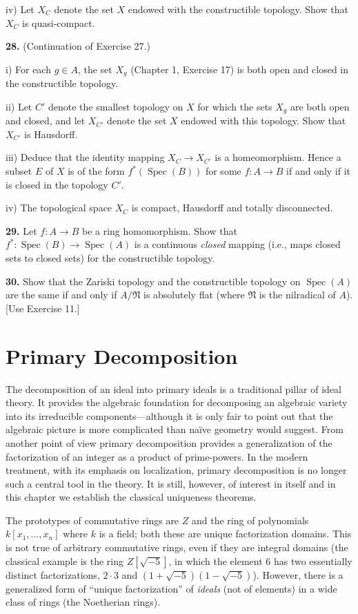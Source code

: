 iv) Let \(X_C\) denote the set \(X\) endowed with the constructible topology. Show that \(X_C\) is quasi-compact.

\noindent\textbf{28.} (Continuation of Exercise 27.)

i) For each \(g\in A\), the set \(X_g\) (Chapter 1, Exercise 17) is both open and closed in the constructible topology.

ii) Let \(C'\) denote the smallest topology on \(X\) for which the sets \(X_g\) are both open and closed, and let \(X_{C'}\) denote the set \(X\) endowed with this topology. Show that \(X_{C'}\) is Hausdorff.

iii) Deduce that the identity mapping \(X_C\to X_{C'}\) is a homeomorphism. Hence a subset \(E\) of \(X\) is of the form \(f^*(\operatorname{Spec}(B))\) for some \(f:A\to B\) if and only if it is closed in the topology \(C'\).

iv) The topological space \(X_C\) is compact, Hausdorff and totally disconnected.

\noindent\textbf{29.} Let \(f:A\to B\) be a ring homomorphism. Show that \(f^*:\operatorname{Spec}(B)\to\operatorname{Spec}(A)\) is a continuous \emph{closed} mapping (i.e., maps closed sets to closed sets) for the constructible topology.

\noindent\textbf{30.} Show that the Zariski topology and the constructible topology on \(\operatorname{Spec}(A)\) are the same if and only if \(A/\mathfrak N\) is absolutely flat (where \(\mathfrak N\) is the nilradical of \(A\)). [Use Exercise 11.]

\section{Primary Decomposition}

The decomposition of an ideal into primary ideals is a traditional pillar of ideal theory. It provides the algebraic foundation for decomposing an algebraic variety into its irreducible components---although it is only fair to point out that the algebraic picture is more complicated than na\"ive geometry would suggest. From another point of view primary decomposition provides a generalization of the factorization of an integer as a product of prime-powers. In the modern treatment, with its emphasis on localization, primary decomposition is no longer such a central tool in the theory. It is still, however, of interest in itself and in this chapter we establish the classical uniqueness theorems.

The prototypes of commutative rings are \(Z\) and the ring of polynomials \(k[x_1,\ldots,x_n]\) where \(k\) is a field; both these are unique factorization domains. This is not true of arbitrary commutative rings, even if they are integral domains (the classical example is the ring \(Z[\sqrt{-5}]\), in which the element 6 has two essentially distinct factorizations, \(2\cdot3\) and \((1+\sqrt{-5})(1-\sqrt{-5})\)). However, there is a generalized form of ``unique factorization'' of \emph{ideals} (not of elements) in a wide class of rings (the Noetherian rings).

